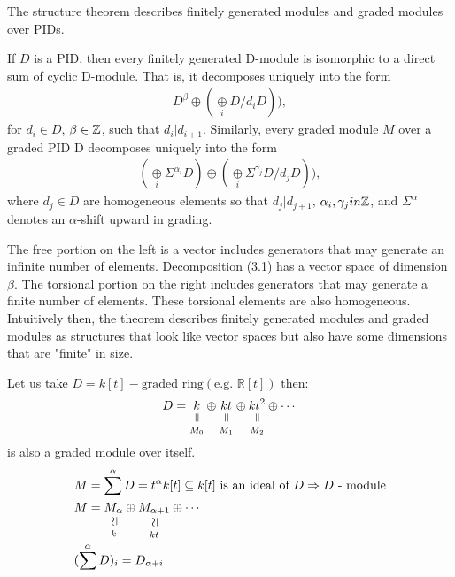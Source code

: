 \documentclass[11pt,a4paper]{report}
\newcommand{\verteq}{\rotatebox{90}{$\,=$}}
\newcommand{\vertsimeq}{\rotatebox{90}{$\,\simeq$}}
\newcommand{\equalto}[2]{\underset{\scriptstyle\overset{\mkern4mu\verteq}{#2}}{#1}}
\newcommand{\simequalto}[2]{\underset{\scriptstyle\overset{\mkern4mu\vertsimeq}{#2}}{#1}}
\begin{document}
              The structure theorem describes finitely generated modules and graded modules over PIDs.
              \begin{thm}  \label{Structure}
              If $D$ is a PID, then every finitely generated D-module is isomorphic to a direct sum of cyclic D-module. That is, it decomposes uniquely into the form
              \begin{align}
                D^\beta \oplus (\underset{i}{\oplus} D/d_iD)),
              \end{align}
              for $d_i \in D$, $\beta \in \mathbb{Z}$, such that $d_i| d_{i+1}.$ Similarly, every graded module $M$ over a graded PID D decomposes uniquely into the form
               \begin{align}
                (\underset{i}{\oplus} \Sigma^{\alpha_i} D) \oplus (\underset{i}{\oplus} \Sigma ^{\gamma_j} D/d_jD)),
              \end{align}
              where $d_j \in D$ are homogeneous elements so that $d_j|d_{j+1}$, $\alpha_i, \gamma_j in \mathbb{Z}$, and $\Sigma^\alpha$ denotes an $\alpha$-shift upward in grading.
              \end{thm}
              The free portion on the left is a vector includes generators that may generate an infinite number of elements. Decomposition (3.1) has a vector space of dimension $\beta$. The torsional portion on the right includes generators that
               may generate a finite number of elements. These torsional elements are also homogeneous. Intuitively then, the theorem describes finitely generated modules and graded modules as structures that look like vector spaces but also
                have some dimensions that are "finite" in size.


              \begin{Ex}
               Let us take $D = k[t] - \textrm{graded ring} (\textrm{e.g. } \mathbb{R}[t])$
               then:
               \[
                D = \equalto{k}{M_0} \oplus \equalto{kt}{M_1} \oplus \equalto{kt^2}{M_2} \oplus \cdots
                \]
                is also a graded module over itself.
              \begin{align*}
                &M = \sum^\alpha D = t^\alpha k[t] \subseteq k[t] \textrm{  is an ideal of } D \Rightarrow D \textrm{ - module}\\
                &M = \simequalto{M_\alpha}{k} \oplus \simequalto{M_{\alpha+1}}{kt} \oplus \cdots\\
                &(\sum^\alpha D)_i = D_{\alpha+i}\\
              \end{align*}
              \end{Ex}
\end{document}

